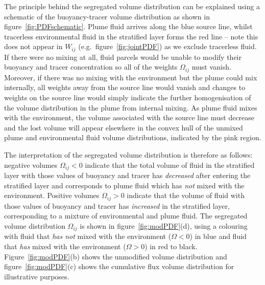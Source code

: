 \documentclass[a4paper]{article}
\begin{document}
The principle behind the segregated volume distribution can be explained using a schematic of the
buoyancy-tracer volume distribution as shown in figure~\ref{fig:PDFschematic}. Plume fluid arrives along the
blue source line, whilst tracerless environmental fluid in the stratified layer forms the red line -- note
this does not appear in $W_{ij}$ (e.g.\ figure~\ref{fig:jointPDF}) as we exclude tracerless fluid. If there
were no mixing at all, fluid parcels would be unable to modify their buoyancy and tracer concentration so all
of the weights $\Omega_{ij}$ must vanish.  Moreover, if there was no mixing with the environment but the plume
could mix internally, all weights away from the source line would vanish and changes to weights on the source
line would simply indicate the further homogenisation of the volume distribution in the plume from internal
mixing. As plume fluid mixes with the environment, the volume associated with the source line must decrease
and the lost volume will appear elsewhere in the convex hull of the unmixed plume and environmental fluid
volume distributions, indicated by the pink region. 

The interpretation of the segregated volume distribution is therefore as follows: negative volumes
$\Omega_{ij} < 0$ indicate that the total volume of fluid in the stratified layer with those values of
buoyancy and tracer has \emph{decreased} after entering the stratified layer and corresponds to plume fluid
which has \emph{not} mixed with the environment.  Positive volumes $\Omega_{ij} > 0$ indicate that the volume
of fluid with those values of buoyancy and tracer has \emph{increased} in the stratified layer, corresponding
to a mixture of environmental and plume fluid. The segregated volume distribution $\Omega_{ij}$ is shown in
figure~\ref{fig:modPDF}(d), using a colouring with fluid that \emph{has not} mixed with the environment
($\Omega < 0$) in blue and fluid that \emph{has} mixed with the environment ($\Omega > 0$) in red to black.
Figure~\ref{fig:modPDF}(b) shows the unmodified volume distribution and figure~\ref{fig:modPDF}(c) shows the
cumulative flux volume distribution for illustrative purposes.
\end{document}
